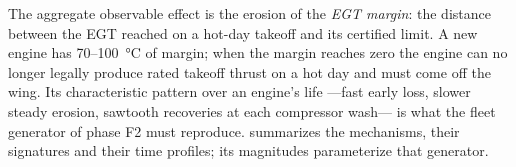 The aggregate observable effect is the erosion of the \emph{EGT margin}: the distance between
the EGT reached on a hot-day takeoff and its certified limit. A new engine has
\SI{70}{}--\SI{100}{\degreeCelsius} of margin; when the margin reaches zero the engine can no
longer legally produce rated takeoff thrust on a hot day and must come off the wing. Its
characteristic pattern over an engine's life ---fast early loss, slower steady erosion, sawtooth
recoveries at each compressor wash--- is what the fleet generator of phase F2 must reproduce.
 summarizes the mechanisms, their signatures and their time profiles; its
magnitudes parameterize that generator.
